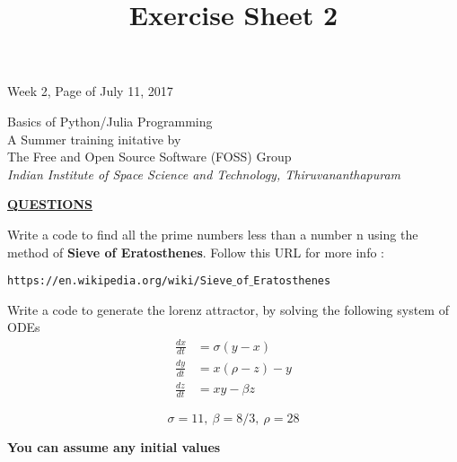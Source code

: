 \documentclass[12pt,final]{exam}
\title{Exercise Sheet 2}
\begin{document}


\pagestyle{headandfoot}
\runningheadrule
{}
{Week 2, Page \thepage of \numpages}
{July 11, 2017}
\firstpagefooter{}{}{}
\runningfooter{}{}{}

\begin{center}
  {\LARGE Basics of Python/Julia Programming}\\
  {\large A Summer training initative by\\
    The Free and Open Source Software (FOSS) Group\\
    \emph{Indian Institute of Space Science and Technology, Thiruvananthapuram}}\\
  \vspace{10pt}
\end{center}

\vspace*{5mm}
\begin{center}
\underline{\textbf{QUESTIONS}}
\end{center}
\vspace*{2mm}
\begin{questions}
\question{} Write a code to find all the prime numbers less than a number n using the method of \textbf{Sieve of Eratosthenes}. Follow this URL for more info :

\texttt{https://en.wikipedia.org/wiki/Sieve$\_$of$\_$Eratosthenes}
  
\question{} Write a code to generate the lorenz attractor, by solving the following system of ODEs
\begin{align}
\frac{dx}{dt} &= \sigma(y - x) \\
\frac{dy}{dt} &= x(\rho - z) - y \\
\frac{dz}{dt} &= xy - \beta z 
\end{align}
\end{questions}
$$\sigma = 11, \ \beta = 8/3, \ \rho = 28$$
\begin{center}
\textbf{You can assume any initial values}
\end{center}
\end{document}
